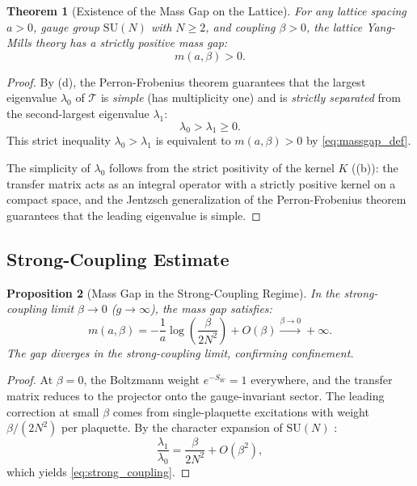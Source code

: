 \documentclass[12pt, a4paper]{article}
\theoremstyle{plain}
\newtheorem{theorem}{Theorem}[section]
\newtheorem{proposition}[theorem]{Proposition}
\theoremstyle{definition}
\theoremstyle{remark}
\newcommand{\SU}{\mathrm{SU}}
\newcommand{\calT}{\mathcal{T}}
\begin{document}
\begin{theorem}[Existence of the Mass Gap on the Lattice]\label{thm:massgap}
  For any lattice spacing $a > 0$, gauge group $\SU(N)$ with $N \geq 2$,
  and coupling $\beta > 0$, the lattice Yang-Mills theory has a strictly
  positive mass gap:
  \begin{equation}
    m(a, \beta) > 0.
  \end{equation}
\end{theorem}

\begin{proof}
  By (d), the Perron-Frobenius theorem guarantees that
  the largest eigenvalue $\lambda_0$ of $\calT$ is \emph{simple} (has
  multiplicity one) and is \emph{strictly separated} from the second-largest
  eigenvalue $\lambda_1$:
  \begin{equation}
    \lambda_0 > \lambda_1 \geq 0.
  \end{equation}
  This strict inequality $\lambda_0 > \lambda_1$ is equivalent to
  $m(a,\beta) > 0$ by \eqref{eq:massgap_def}.

  The simplicity of $\lambda_0$ follows from the strict positivity of
  the kernel $K$ ((b)): the transfer matrix acts as an
  integral operator with a strictly positive kernel on a compact space,
  and the Jentzsch generalization of the Perron-Frobenius theorem
  \citep{ReedSimon1975} guarantees that the leading eigenvalue is simple.
\end{proof}

\subsection{Strong-Coupling Estimate}

\begin{proposition}[Mass Gap in the Strong-Coupling Regime]\label{prop:strong}
  In the strong-coupling limit $\beta \to 0$ ($g \to \infty$), the mass gap
  satisfies:
  \begin{equation}\label{eq:strong_coupling}
    m(a, \beta) = -\frac{1}{a}\log\!\left(\frac{\beta}{2N^2}\right) + O(\beta)
    \xrightarrow{\beta \to 0} +\infty.
  \end{equation}
  The gap diverges in the strong-coupling limit, confirming confinement.
\end{proposition}

\begin{proof}
  At $\beta = 0$, the Boltzmann weight $e^{-S_W} = 1$ everywhere, and the
  transfer matrix reduces to the projector onto the gauge-invariant sector.
  The leading correction at small $\beta$ comes from single-plaquette
  excitations with weight $\beta/(2N^2)$ per plaquette. By the character
  expansion of $\SU(N)$ \citep{CreutzBook, RotheBook}:
  \begin{equation}
    \frac{\lambda_1}{\lambda_0} = \frac{\beta}{2N^2} + O(\beta^2),
  \end{equation}
  which yields \eqref{eq:strong_coupling}.
\end{proof}
\end{document}
